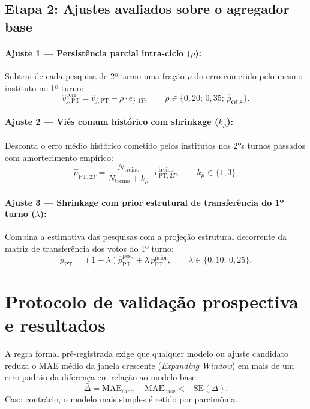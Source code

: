 \documentclass[10.5pt,a4paper]{article}
\begin{document}
\subsection{Etapa 2: Ajustes avaliados sobre o agregador base}

\paragraph{Ajuste 1 --- Persistência parcial intra-ciclo ($\rho$):}
Subtrai de cada pesquisa de 2º turno uma fração $\rho$ do erro cometido pelo mesmo instituto no 1º turno:
\begin{equation}
\hat{v}_{j, \text{PT}}^{\text{corr}} = \hat{v}_{j, \text{PT}} - \rho \cdot e_{j, 1T}, \qquad \rho \in \{0{,}20; \, 0{,}35; \, \hat{\rho}_{\text{OLS}}\}.
\end{equation}

\paragraph{Ajuste 2 --- Viés comum histórico com shrinkage ($k_\mu$):}
Desconta o erro médio histórico cometido pelos institutos nos 2ºs turnos passados com amortecimento empírico:
\begin{equation}
\hat{\mu}_{\text{PT}, 2T} = \frac{N_{\text{treino}}}{N_{\text{treino}} + k_\mu} \cdot \bar{e}_{\text{PT}, 2T}^{\text{treino}}, \qquad k_\mu \in \{1, 3\}.
\end{equation}

\paragraph{Ajuste 3 --- Shrinkage com prior estrutural de transferência do 1º turno ($\lambda$):}
Combina a estimativa das pesquisas com a projeção estrutural decorrente da matriz de transferência dos votos do 1º turno:
\begin{equation}
\hat{p}_{\text{PT}} = (1 - \lambda) \hat{p}_{\text{PT}}^{\text{pesq}} + \lambda \, p_{\text{PT}}^{\text{prior}}, \qquad \lambda \in \{0{,}10; \, 0{,}25\}.
\end{equation}

\section{Protocolo de validação prospectiva e resultados}

A regra formal pré-registrada exige que qualquer modelo ou ajuste candidato reduza o MAE médio da janela crescente (\emph{Expanding Window}) em mais de um erro-padrão da diferença em relação ao modelo base:
\begin{equation}
\bar{\Delta} = \text{MAE}_{\text{cand}} - \text{MAE}_{\text{base}} < -\text{SE}(\Delta).
\end{equation}
Caso contrário, o modelo mais simples é retido por parcimônia.
\end{document}
